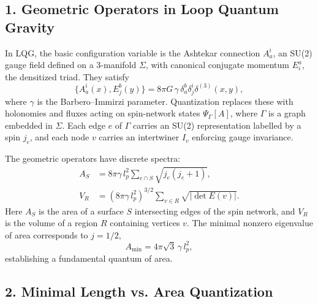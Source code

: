 \documentclass[11pt,oneside]{book}
\numberwithin{equation}{chapter}
\begin{document}
\subsection*{1. Geometric Operators in Loop Quantum Gravity}

In LQG, the basic configuration variable is the Ashtekar connection $A^i_a$, an SU(2) gauge field defined on a 3-manifold $\Sigma$, with canonical conjugate momentum $E^a_i$, the densitized triad.  
They satisfy
\begin{equation}
\{A^i_a(x), E^b_j(y)\} = 8\pi G\,\gamma\,\delta^b_a \delta^i_j \delta^{(3)}(x,y),
\end{equation}
where $\gamma$ is the Barbero–Immirzi parameter.  
Quantization replaces these with holonomies and fluxes acting on spin-network states $\Psi_\Gamma[A]$, where $\Gamma$ is a graph embedded in $\Sigma$.  
Each edge $e$ of $\Gamma$ carries an SU(2) representation labelled by a spin $j_e$, and each node $v$ carries an intertwiner $I_v$ enforcing gauge invariance.

The geometric operators have discrete spectra:
\begin{align*}
A_S &= 8\pi\gamma\,l_p^2
\sum_{e\cap S} \sqrt{j_e(j_e+1)}, \\[3pt]
V_R &= (8\pi\gamma\,l_p^2)^{3/2}
\sum_{v\in R}
\sqrt{|\det E(v)|}.
\end{align*}
Here $A_S$ is the area of a surface $S$ intersecting edges of the spin network, and $V_R$ is the volume of a region $R$ containing vertices $v$.  
The minimal nonzero eigenvalue of area corresponds to $j=1/2$,
\begin{equation}
A_{\min} = 4\pi\sqrt{3}\,\gamma\,l_p^2,
\end{equation}
establishing a fundamental quantum of area.

\subsection*{2. Minimal Length vs. Area Quantization}
\end{document}
